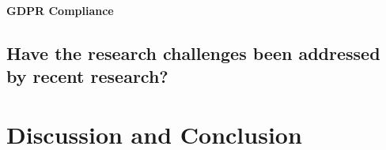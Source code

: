 \documentclass[runningheads]{llncs}
\begin{document}
\paragraph{GDPR Compliance}
\subsection{Have the research challenges been addressed by recent research?}\label{Q2}

\section{Discussion and Conclusion}\label{Conclusion}

%
%
% 
% 
%

{}
\end{document}
